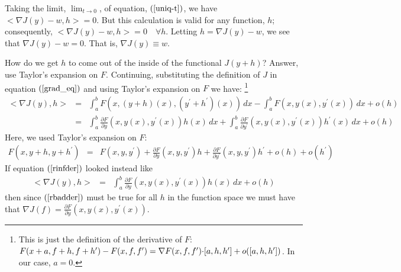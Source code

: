 \documentclass{article}
\begin{document}
Taking the limit, $\lim_{t \rightarrow 0}$, of equation, 
$(\ref{uniq-t})$, we have $<\!\nabla J(y) - w, h> = 0$.
But this calculation is valid for any function, $h$; consequently, 
$<\!\nabla J(y) - w, h> = 0 \quad \forall h$.
Letting $h = \nabla J(y) - w$, we see that $\nabla J(y) - w = 0$.
That is, $\nabla J(y) \equiv w$.

How do we get $h$ to come out of the inside of the functional $J(y+h)$? Answer, use
Taylor's expansion on $F$. Continuing, substituting the definition of $J$ in equation
$(\ref{grad_eq})$ and using Taylor's expansion on $F$ we have:%
\footnote{This is just the definition of the derivative of $F$:
$F(x + a, f+h, f+h^\prime) - F(x,f,f^\prime) = \nabla F(x,f,f^\prime) {\bf \cdot} [a,h,h^\prime] + o([a,h,h^\prime])$. In our case, $a = 0$.
}
\begin{eqnarray}
  <\!\nabla J(y), h\!>  & = & \int_a^b F(x, (y+h)(x), (y^\prime + h^\prime)(x)) \, dx
  - \int_a^b F(x, y(x), y^\prime(x)) \, dx  + o(h) \nonumber \\
& = & \int_a^b \frac{\partial F}{\partial y}(x, y(x), y^\prime(x))h(x)\, dx
+ \int_a^b \frac{\partial F}{\partial y^\prime}(x, y(x), y^\prime(x))h^\prime(x) \, dx
+ o(h) \label{rinfder}
\end{eqnarray}
Here, we used Taylor's expansion on $F$:
\begin{eqnarray}
  F(x, y+h, y+h^\prime) & = & F(x,y,y^\prime) + \frac{\partial F}{\partial y}(x,y,y^\prime) h + \frac{\partial F}{\partial
    y^\prime}(x,y,y^\prime) h^\prime + o(h) + o(h^\prime)
\end{eqnarray}
If equation $(\ref{rinfder})$ looked instead like
\begin{eqnarray}
  <\!\nabla J(y), h\!>  & = &
 \int_a^b \frac{\partial F}{\partial y}(x, y(x), y^\prime(x))h(x)\, dx
+ o(h) \label{rbadder}
\end{eqnarray}
then since $(\ref{rbadder})$ must be true for all $h$ in the function space we must
have that $\nabla J(f) = \frac{\partial F}{\partial y}(x, y(x), y^\prime(x))$.
\end{document}

